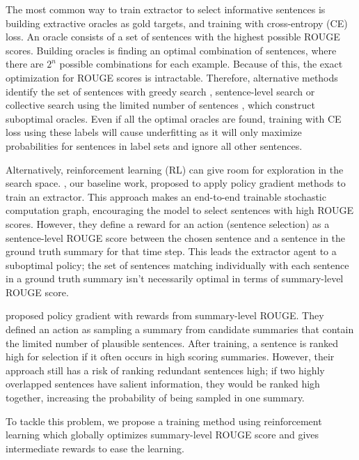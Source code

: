 \documentclass[11pt,a4paper]{article}
\begin{document}
The most common way to train extractor to select
informative sentences is building extractive oracles
as gold targets, and training with cross-entropy (CE) loss.
An oracle consists of a set of sentences with the highest possible
ROUGE scores. Building oracles is finding an optimal combination of sentences,
where there are $2^n$ possible combinations for each example.
Because of this, the exact optimization for ROUGE scores is intractable. 
Therefore, alternative methods identify the set of sentences
with greedy search \cite{nallapati2017summarunner},
sentence-level search \cite{hsu-etal-2018-unified, shi2019deepchannel}
or collective search using the limited number of sentences \cite{xu2019neural},
which construct suboptimal oracles.
Even if all the optimal oracles are found,
training with CE loss using these labels will cause underfitting
as it will only maximize probabilities for sentences
in label sets and ignore all other sentences.

Alternatively, reinforcement learning (RL) can give room for exploration in the search space.
\citet{chen-bansal-2018-fast}, our baseline work,
proposed to apply policy gradient methods to train an extractor.
This approach makes an end-to-end trainable stochastic
computation graph, encouraging the model to select sentences
with high ROUGE scores. However, they define a reward for an action
(sentence selection) as a sentence-level ROUGE score between
the chosen sentence and a sentence in the ground truth summary
for that time step. This leads the extractor agent to a suboptimal policy;
the set of sentences matching individually with each sentence in a ground truth summary
isn't necessarily optimal in terms of summary-level ROUGE score.

\citet{narayan-etal-2018-ranking} proposed policy gradient
with rewards from summary-level ROUGE.
They defined an action as sampling a summary from candidate summaries
that contain the limited number of plausible sentences. After training,
a sentence is ranked high for selection
if it often occurs in high scoring summaries.
However, their approach still has a risk of ranking redundant sentences high;
if two highly overlapped sentences have salient information,
they would be ranked high together, increasing the probability of being sampled
in one summary.

To tackle this problem, we propose a training method
using reinforcement learning which globally optimizes
summary-level ROUGE score and gives intermediate rewards
to ease the learning.
\end{document}
